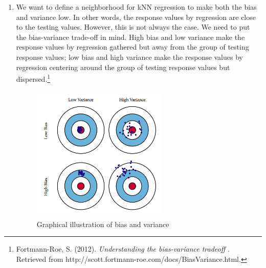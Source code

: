 \documentclass[10pt]{article}
\begin{document}
\begin{enumerate}[1)]
\item
We want to define a neighborhood for kNN regression to make both the bias and variance low. In other words, the response values by regression are close to the testing values. However, this is not always the case. We need to put the bias-variance trade-off in mind. High bias and low variance make the response values by regression gathered but away from the group of testing response values; low bias and high variance make the response values by regression centering around the group of testing response values but dispersed.\footnote{ Fortmann-Roe, S. (2012). \textit{Understanding the bias-variance tradeoff }. Retrieved from http://scott.fortmann-roe.com/docs/BiasVariance.html.} %
\begin{figure}[H]
  \centering
  \includegraphics[width=6.5cm,height=6.5cm]{p34a.png}
  \caption{Graphical illustration of bias and variance}
\end{figure}

\vspace{3mm}
\end{enumerate}
\vspace{3mm}
\end{document}
